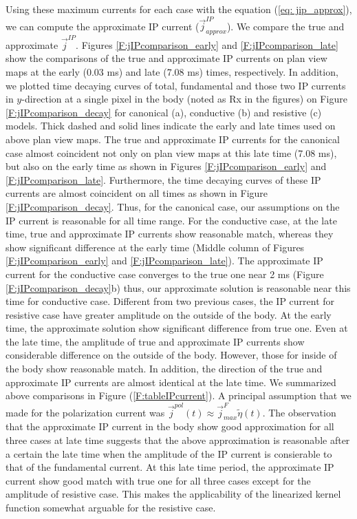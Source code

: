 \documentclass[a4paper, 11pt]{article}
\renewcommand {\j}  { {\vec j} }
\newcommand{\peta}{\tilde{\eta}}
\begin{document}
Using these maximum currents for each case with the equation (\ref{eq: jip_approx}), we can compute the approximate IP current ($\j^{IP}_{approx}$). We compare the true and approximate $\j^{IP}$. Figures \ref{F:jIPcomparison_early} and \ref{F:jIPcomparison_late} show the comparisons of the true and approximate IP currents on plan view maps at the early (0.03 ms) and late (7.08 ms) times, respectively.  In addition, we plotted time decaying curves of total, fundamental and those two IP currents in $y$-direction at a single pixel in the body (noted as Rx in the figures) on Figure \ref{F:jIPcomparison_decay} for canonical (a), conductive (b) and resistive (c) models. Thick dashed and solid lines indicate the early and late times used on above plan view maps. The true and approximate IP currents for the canonical case almost coincident not only on plan view maps at this late time (7.08 ms), but also on the early time as shown in Figures \ref{F:jIPcomparison_early} and \ref{F:jIPcomparison_late}. Furthermore, the time decaying curves of these IP currents are almost coincident on all times as shown in Figure \ref{F:jIPcomparison_decay}. Thus, for the canonical case, our assumptions on the IP current is reasonable for all time range. For the conductive case, at the late time, true and approximate IP currents show reasonable match, whereas they show significant difference at the early time (Middle column of Figures \ref{F:jIPcomparison_early} and \ref{F:jIPcomparison_late}). The approximate IP current for the conductive case converges to the true one near 2 ms (Figure \ref{F:jIPcomparison_decay}b) thus, our approximate solution is reasonable near this time for conductive case. Different from two previous cases, the IP current for resistive case have greater amplitude on the outside of the body. At the early time, the approximate solution show significant difference from true one. Even at the late time, the amplitude of true and approximate IP currents show considerable difference on the outside of the body. However, those for inside of the body show reasonable match. In addition, the direction of the true and approximate IP currents are almost identical at the late time. We summarized above comparisons in Figure (\ref{F:tableIPcurrent}). A principal assumption that we made for the polarization current was $\j^{pol}(t) \approx \j^{F}_{max}\peta(t)$. The observation that the approximate IP current in the body show good approximation for all three cases at late time suggests that the above approximation is reasonable after a certain the late time when the amplitude of the IP current is consierable to that of the fundamental current. At this late time period, the approximate IP current show good match with true one for all three cases except for the amplitude of resistive case. This makes the applicability of the linearized kernel function somewhat arguable for the resistive case. 
\end{document}
